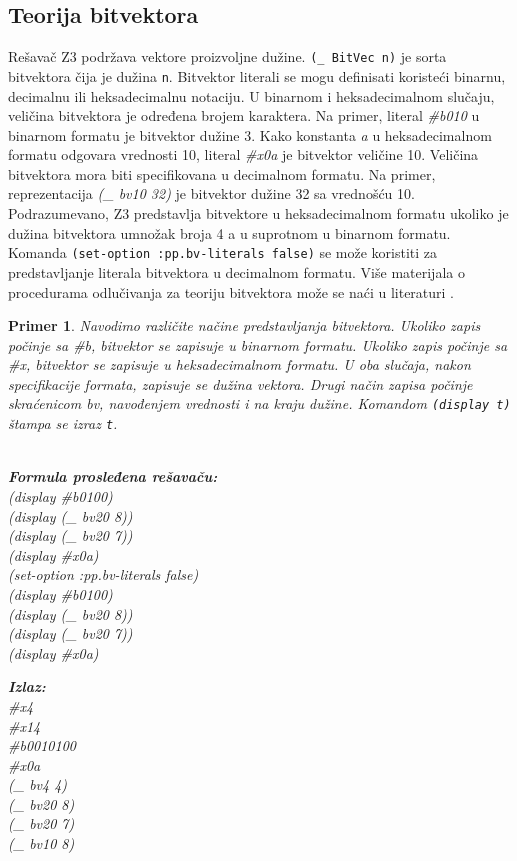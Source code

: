 \documentclass[12pt,oneside]{memoir}
\newtheorem{primer}{Primer}
\begin{document}
\subsection{Teorija bitvektora} 
Rešavač Z3 podržava vektore proizvoljne dužine. \texttt{(\_ BitVec n)} je sorta bitvektora čija je dužina \texttt{n}. Bitvektor literali se mogu definisati koristeći binarnu, decimalnu ili heksadecimalnu notaciju. U binarnom i heksadecimalnom slučaju, veličina bitvektora je određena brojem karaktera. Na primer, literal \textit{\#b010} u binarnom formatu je bitvektor dužine 3. Kako konstanta \textit{a} u heksadecimalnom formatu odgovara vrednosti 10, literal \textit{\#x0a} je bitvektor veličine 10. Veličina bitvektora mora biti specifikovana u decimalnom formatu. Na primer, reprezentacija \textit{(\_ bv10 32)} je bitvektor dužine 32 sa vrednošću 10. Podrazumevano, Z3 predstavlja bitvektore u heksadecimalnom formatu ukoliko je dužina bitvektora umnožak broja 4 a u suprotnom u binarnom formatu. Komanda 
\texttt{(set-option :pp.bv-literals false)} se može koristiti za predstavljanje literala bitvektora u decimalnom formatu. Više materijala o procedurama odlučivanja za teoriju bitvektora može se naći u literaturi \cite{DPBitvector}.
\begin{primer} Navodimo različite načine predstavljanja bitvektora. Ukoliko zapis počinje sa \#b, bitvektor se zapisuje u binarnom formatu. Ukoliko zapis počinje sa \#x, bitvektor se zapisuje u heksadecimalnom formatu. U oba slučaja, nakon specifikacije formata, zapisuje se dužina vektora. Drugi način zapisa počinje skraćenicom bv, navođenjem vrednosti i na kraju dužine. Komandom \texttt{(display t)} štampa se izraz \texttt{t}.\\\\
\begin{minipage}[b]{0.45\textwidth}
\textbf{Formula prosleđena rešavaču:}
\\(display \#b0100)
\\(display (\_ bv20 8))
\\(display (\_ bv20 7))
\\(display \#x0a) 
\\(set-option :pp.bv-literals false)
\\(display \#b0100)
\\(display (\_ bv20 8))
\\(display (\_ bv20 7))
\\(display \#x0a)
\end{minipage}
\hspace{2.5cm}
\begin{minipage}[t]{0.4\textwidth}
\vspace{-5.93cm}
\textbf{Izlaz:}
\\\#x4 
\\\#x14 
\\\#b0010100 
\\\#x0a 
\\(\_ bv4 4) 
\\(\_ bv20 8) 
\\(\_ bv20 7) 
\\(\_ bv10 8)
\end{minipage}
\end{primer}
\end{document}
